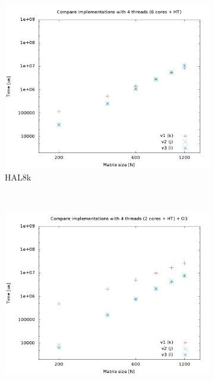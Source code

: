 \documentclass[a4paper, 12pt]{article}
\begin{document}
\begin{figure}[H]
    \centering
    \begin{subfigure}[H]{0.5\textwidth}
        \includegraphics[width=\textwidth]{HAL_cmp_versions-4t}
        \caption{HAL8k}
        \label{fig:8k_cmp_4t}
    \end{subfigure}%
    ~ %
    \begin{subfigure}[H]{0.5\textwidth}
        \includegraphics[width=\textwidth]{hpops2_O3_cmp_versions-4t}

\end{subfigure}
\end{figure}
\end{document}
